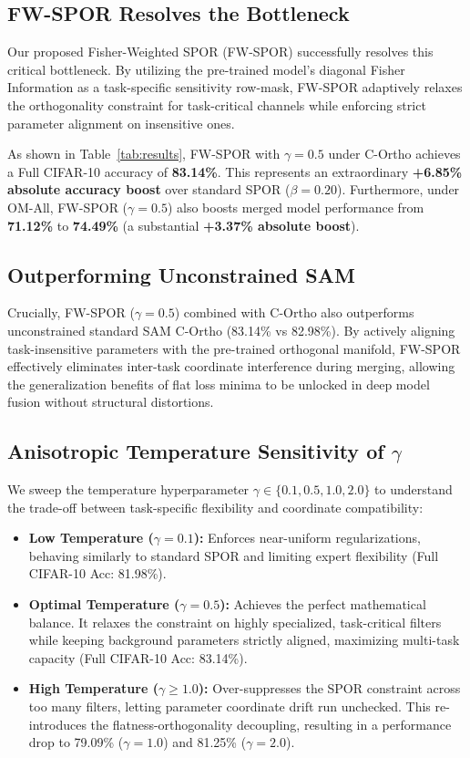 \documentclass{article}
\theoremstyle{plain}
\theoremstyle{definition}
\theoremstyle{remark}
\begin{document}
\subsection{FW-SPOR Resolves the Bottleneck}
Our proposed Fisher-Weighted SPOR (FW-SPOR) successfully resolves this critical bottleneck. By utilizing the pre-trained model's diagonal Fisher Information as a task-specific sensitivity row-mask, FW-SPOR adaptively relaxes the orthogonality constraint for task-critical channels while enforcing strict parameter alignment on insensitive ones. 

As shown in Table~\ref{tab:results}, FW-SPOR with $\gamma = 0.5$ under C-Ortho achieves a Full CIFAR-10 accuracy of \textbf{83.14\%}. This represents an extraordinary \textbf{+6.85\% absolute accuracy boost} over standard SPOR ($\beta=0.20$). Furthermore, under OM-All, FW-SPOR ($\gamma = 0.5$) also boosts merged model performance from \textbf{71.12\%} to \textbf{74.49\%} (a substantial \textbf{+3.37\% absolute boost}). 

\subsection{Outperforming Unconstrained SAM}
Crucially, FW-SPOR ($\gamma = 0.5$) combined with C-Ortho also outperforms unconstrained standard SAM C-Ortho (83.14\% vs 82.98\%). By actively aligning task-insensitive parameters with the pre-trained orthogonal manifold, FW-SPOR effectively eliminates inter-task coordinate interference during merging, allowing the generalization benefits of flat loss minima to be unlocked in deep model fusion without structural distortions.

\subsection{Anisotropic Temperature Sensitivity of $\gamma$}
We sweep the temperature hyperparameter $\gamma \in \{0.1, 0.5, 1.0, 2.0\}$ to understand the trade-off between task-specific flexibility and coordinate compatibility:
\begin{itemize}
    \item \textbf{Low Temperature ($\gamma = 0.1$):} Enforces near-uniform regularizations, behaving similarly to standard SPOR and limiting expert flexibility (Full CIFAR-10 Acc: 81.98\%).
    \item \textbf{Optimal Temperature ($\gamma = 0.5$):} Achieves the perfect mathematical balance. It relaxes the constraint on highly specialized, task-critical filters while keeping background parameters strictly aligned, maximizing multi-task capacity (Full CIFAR-10 Acc: 83.14\%).
    \item \textbf{High Temperature ($\gamma \ge 1.0$):} Over-suppresses the SPOR constraint across too many filters, letting parameter coordinate drift run unchecked. This re-introduces the flatness-orthogonality decoupling, resulting in a performance drop to 79.09\% ($\gamma=1.0$) and 81.25\% ($\gamma=2.0$).
\end{itemize}
\end{document}

